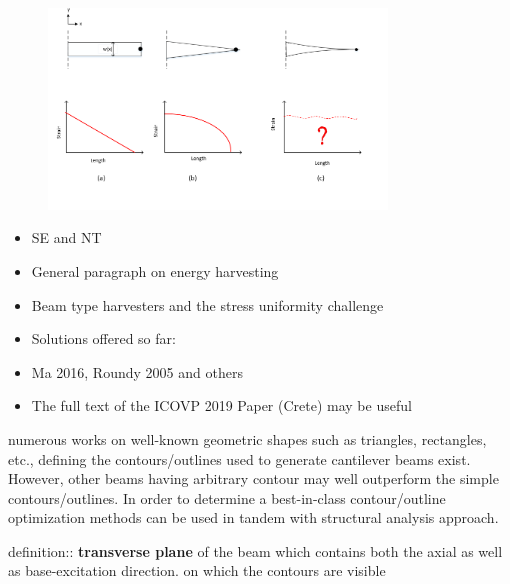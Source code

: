 \documentclass{article}
\begin{document}
\begin{figure}[ht!]
\centering
\includegraphics[width=90mm]{figures/graph.PNG}
\caption{ \label{overflow}}
\end{figure}
\label{sec intro}
\begin{itemize}

    \item SE and NT
    \item General paragraph on energy harvesting
    \item Beam type harvesters and the stress uniformity challenge
    \item Solutions offered so far:
    \item Ma 2016, Roundy 2005 and others
    \item The full text of the ICOVP 2019 Paper (Crete) may be useful
\end{itemize}

numerous works on well-known geometric shapes such as triangles, rectangles, etc., defining the contours/outlines used to generate cantilever beams exist.  However, other beams having arbitrary contour may well outperform the simple contours/outlines. In order to determine a best-in-class contour/outline optimization methods can be used in tandem with structural analysis approach.

definition:: \textbf{transverse plane} of the beam which contains both the axial as well as base-excitation direction. on which the contours are visible
\end{document}
